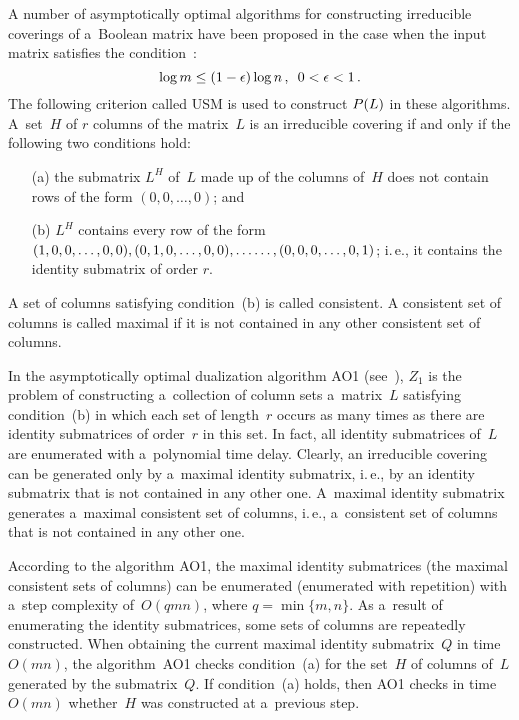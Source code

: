 \begin{multicols}{2}
A number of asymptotically optimal algorithms for constructing
irreducible coverings of a~Boolean matrix have been proposed in
the case when the input matrix satisfies the condition~\cite{D1977, D1987, DZ1997, DZ2000, D2003, D2004, DI2008,DP2014, KA2010}:
$$\log m \le
(1-\epsilon) \log n\,,\enskip 0 < \epsilon < 1\,.
$$
 The
following criterion called USM is used to construct  $P( L )$ in
these algorithms. A~set~$H$ of  $r$ columns of the matrix~$L$ is
an irreducible covering if and only if the following two
conditions hold:
\begin{itemize}
    \item[(a)]
    the submatrix  $L^H$ of~$L$ made up of the columns
    of~$H$ does not contain rows of the form  $(0, 0, \ldots, 0)$; and
    \item[(b)] $L^H$ contains every row of the form $(1, 0, 0, \ldots,
    0, 0), (0, 1, 0, \ldots, 0, 0), \ldots\linebreak \ldots , (0, 0, 0,
    \ldots, 0, 1)$;
    i.\,e., it contains the identity submatrix of order $r$.
\end{itemize}
A set of columns satisfying condition~(b) is called
{consistent}. A consistent set of columns is called
{maximal} if it is not contained in any other consistent set
of columns.


In the asymptotically optimal dualization algorithm AO1 (see~\cite{D1977}), 
$Z_1$ is the problem of constructing a~collection
of column sets a~matrix~$L$ satisfying condition~(b) in which each
set of length~$r$ occurs as many times as there are identity
submatrices of order~$r$ in this set. In fact, all identity
submatrices of~$L$ are enumerated with a~polynomial time delay.
Clearly, an irreducible covering can be generated only by a~maximal identity submatrix, i.\,e., by an identity submatrix that is
not contained in any other one. A~maximal identity submatrix
generates a~maximal consistent set of columns, i.\,e., a~consistent
set of columns that is not contained in any other one.

According to the algorithm AO1, the maximal identity submatrices
(the maximal consistent sets of columns) can be enumerated
(enumerated with repetition) with a~step complexity of~$O(qmn)$,
where $q = \min\{m, n\}$. As a~result of enumerating the identity
submatrices, some sets of columns are repeatedly constructed. When
obtaining the current maximal identity submatrix~$Q$ in time
$O(mn)$, the algorithm~AO1 checks condition~(a) for the set~$H$ of
columns of~$L$ generated by the submatrix~$Q$. If condition~(a)
holds, then AO1 checks in time $O(mn)$ whether~$H$ was constructed
at a~previous step.


\end{multicols}
